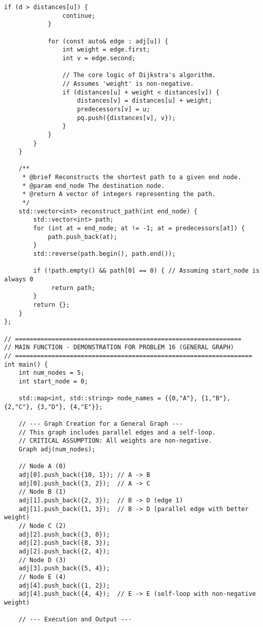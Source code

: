 \documentclass[a4paper,12pt]{article}
\begin{document}
\begin{lstlisting}[style=cppstyle, caption={Xây dựng đồ thị tổng quát trong C++ (chỉ trọng số không âm).}, label={lst:cpp_16}]
            if (d > distances[u]) {
                continue;
            }

            for (const auto& edge : adj[u]) {
                int weight = edge.first;
                int v = edge.second;

                // The core logic of Dijkstra's algorithm.
                // Assumes 'weight' is non-negative.
                if (distances[u] + weight < distances[v]) {
                    distances[v] = distances[u] + weight;
                    predecessors[v] = u;
                    pq.push({distances[v], v});
                }
            }
        }
    }

    /**
     * @brief Reconstructs the shortest path to a given end node.
     * @param end_node The destination node.
     * @return A vector of integers representing the path.
     */
    std::vector<int> reconstruct_path(int end_node) {
        std::vector<int> path;
        for (int at = end_node; at != -1; at = predecessors[at]) {
            path.push_back(at);
        }
        std::reverse(path.begin(), path.end());
        
        if (!path.empty() && path[0] == 0) { // Assuming start_node is always 0
             return path;
        }
        return {};
    }
};

// ==============================================================
// MAIN FUNCTION - DEMONSTRATION FOR PROBLEM 16 (GENERAL GRAPH)
// =================================================================
int main() {
    int num_nodes = 5;
    int start_node = 0;

    std::map<int, std::string> node_names = {{0,"A"}, {1,"B"}, {2,"C"}, {3,"D"}, {4,"E"}};
    
    // --- Graph Creation for a General Graph ---
    // This graph includes parallel edges and a self-loop.
    // CRITICAL ASSUMPTION: All weights are non-negative.
    Graph adj(num_nodes);
    
    // Node A (0)
    adj[0].push_back({10, 1}); // A -> B
    adj[0].push_back({3, 2});  // A -> C
    // Node B (1)
    adj[1].push_back({2, 3});  // B -> D (edge 1)
    adj[1].push_back({1, 3});  // B -> D (parallel edge with better weight)
    // Node C (2)
    adj[2].push_back({3, 0});
    adj[2].push_back({8, 3});
    adj[2].push_back({2, 4});
    // Node D (3)
    adj[3].push_back({5, 4});
    // Node E (4)
    adj[4].push_back({1, 2});
    adj[4].push_back({4, 4});  // E -> E (self-loop with non-negative weight)
    
    // --- Execution and Output ---
    

\end{lstlisting}
\end{document}
